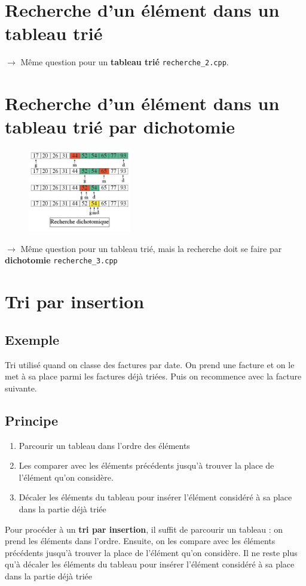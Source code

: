 \documentclass[french]{article}
\begin{document}
\section{Recherche d'un élément dans un tableau trié}
	$\rightarrow$ Même question pour un \textbf{tableau trié} \texttt{recherche\_2.cpp}.
	\section{Recherche d'un élément dans un tableau trié par dichotomie}
	
	\begin{figure}[h]
		\centering
		\includegraphics[width=0.4\textwidth]{dicho.jpg}
	\end{figure}
	$\rightarrow$ Même question pour un tableau trié, mais la recherche doit se faire par \textbf{dichotomie} \texttt{recherche\_3.cpp}
\section{Tri par insertion}

\subsection*{Exemple}
Tri utilisé quand on classe des factures par date. On prend une facture et on le met à sa place parmi les factures déjà triées. Puis on recommence avec la facture suivante. 

\subsection*{Principe}
\begin{enumerate}
	\item Parcourir un tableau dans l'ordre des éléments
	\item Les comparer avec les éléments précédents jusqu'à trouver la place de l'élément qu'on considère.
	\item Décaler les éléments du tableau pour insérer l'élément considéré à sa place dans la partie déjà triée
\end{enumerate} 
Pour procéder à un \textbf{tri par insertion}, il suffit de parcourir un tableau : on prend les éléments dans l'ordre. Ensuite, on les compare avec les éléments précédents jusqu'à trouver la place de l'élément qu'on considère. Il ne reste plus qu'à décaler les éléments du tableau pour insérer l'élément considéré à sa place dans la partie déjà triée
\end{document}
